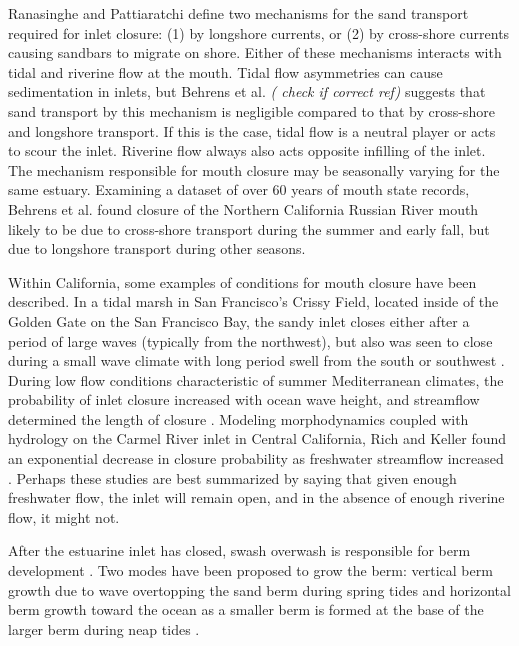 Ranasinghe and Pattiaratchi \parencite*{ranasinghe_seasonal_2003} define two mechanisms for the sand transport required for inlet closure: (1) by longshore currents, or (2) by cross-shore currents causing sandbars to migrate on shore. Either of these mechanisms interacts  with tidal and riverine flow at the mouth. Tidal flow asymmetries can cause sedimentation in inlets, but Behrens et al. \emph{(\parencite*{behrens_episodic_2013} check if correct ref)} suggests that sand transport by this mechanism is negligible compared to that by cross-shore and longshore transport. If this is the case, tidal flow is a neutral player or acts to scour the inlet. Riverine flow always also acts opposite infilling of the inlet. The mechanism responsible for mouth closure may be seasonally varying for the same estuary. Examining a dataset of over 60 years of mouth state records, Behrens et al. \parencite*{behrens_episodic_2013} found closure of the Northern California Russian River mouth likely to be due to cross-shore transport during the summer and early fall, but due to longshore transport during other seasons.

Within California, some examples of conditions for mouth closure have been described. In a tidal marsh in San Francisco's Crissy Field, located inside of the Golden Gate on the San Francisco Bay, the sandy inlet closes either after a period of large waves (typically from the northwest), but also was seen to close during a small wave climate with long period swell from the south or southwest \parencite{hanes_waves_2011}. During low flow conditions characteristic of summer Mediterranean climates, the probability of inlet closure increased with ocean wave height, and streamflow determined the length of closure \parencite{behrens_episodic_2013}. Modeling morphodynamics coupled with hydrology on the Carmel River inlet in Central California, Rich and Keller found an exponential decrease in closure probability as freshwater streamflow increased \parencite*{rich_hydrologic_2013}. Perhaps these studies are best summarized by saying that given enough freshwater flow, the inlet will remain open, and in the absence of enough riverine flow, it might not.

After the estuarine inlet has closed, swash overwash is responsible for berm development \parencite{baldock_morphodynamic_2008}. Two modes have been proposed to grow the berm: vertical berm growth due to wave overtopping the sand berm during spring tides and horizontal berm growth toward the ocean as a smaller berm is formed at the base of the larger berm during neap tides \parencite{weir_beach_2006}. 

